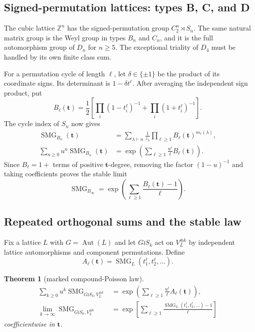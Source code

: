 \documentclass[10pt]{article}
\newcommand{\SMG}{\operatorname{SMG}}
\newcommand{\MGF}{\SMG}
\newcommand{\Z}{\mathbb Z}
\newcommand{\Aut}{\operatorname{Aut}}
\newtheorem{theorem}{Theorem}
\begin{document}
\subsection{Signed-permutation lattices: types B, C, and D}

The cubic lattice $\Z^n$ has the signed-permutation group
$C_2^n\rtimes S_n$.  The same natural matrix group is the Weyl group in types
$B_n$ and $C_n$, and it is the full automorphism group of $D_n$ for $n\ge5$.
The exceptional triality of $D_4$ must be handled by its own finite class sum.

For a permutation cycle of length $\ell$, let $\delta\in\{\pm1\}$ be the
product of its coordinate signs.  Its determinant is $1-\delta t^\ell$.
After averaging the independent sign product, put
\begin{equation}\label{nd:lattices:eq:b-ell}
 B_\ell(\mathbf t)=\frac12\left[
 \prod_i(1-t_i^\ell)^{-1}+\prod_i(1+t_i^\ell)^{-1}\right].
\end{equation}
The cycle index of $S_n$ now gives
\begin{align}
 \MGF_{B_n}(\mathbf t)
 &=\sum_{\lambda\vdash n}\frac1{z_\lambda}
   \prod_{\ell\ge1}B_\ell(\mathbf t)^{m_\ell(\lambda)},
   \label{nd:lattices:eq:b-formula}\\
 \sum_{n\ge0}u^n\MGF_{B_n}(\mathbf t)
 &=\exp\!\left(\sum_{\ell\ge1}\frac{u^\ell}{\ell}B_\ell(\mathbf t)\right).
 \label{nd:lattices:eq:b-egf}
\end{align}
Since $B_\ell=1+$ terms of positive $\mathbf t$-degree, removing the factor
$(1-u)^{-1}$ and taking coefficients proves the stable limit
\begin{equation}\label{nd:lattices:eq:b-limit}
 \boxed{\MGF_{B_\infty}=\exp\!\left(
 \sum_{\ell\ge1}\frac{B_\ell(\mathbf t)-1}{\ell}\right).}
\end{equation}

\subsection{Repeated orthogonal sums and the stable law}

Fix a lattice $L$ with $G=\Aut(L)$ and let $G\wr S_k$ act on
$V_L^{\oplus k}$ by independent lattice automorphisms and component
permutations.  Define
\[
 A_\ell(\mathbf t)=\MGF_L(t_1^\ell,t_2^\ell,\ldots).
\]

\begin{theorem}[marked compound-Poisson law]\label{nd:lattices:thm:wreath-sum}
\begin{align}
 \sum_{k\ge0}u^k\MGF_{G\wr S_k,V_L^{\oplus k}}
 &=\exp\!\left(\sum_{\ell\ge1}\frac{u^\ell}{\ell}A_\ell(\mathbf t)\right),
 \label{nd:lattices:eq:wreath-sum}\\
 \lim_{k\to\infty}\MGF_{G\wr S_k,V_L^{\oplus k}}
 &=\exp\!\left[\sum_{\ell\ge1}\frac{
 \MGF_L(t_1^\ell,t_2^\ell,\ldots)-1}{\ell}\right]
 \label{nd:lattices:eq:wreath-limit}
\end{align}
coefficientwise in $\mathbf t$.
\end{theorem}
\end{document}
